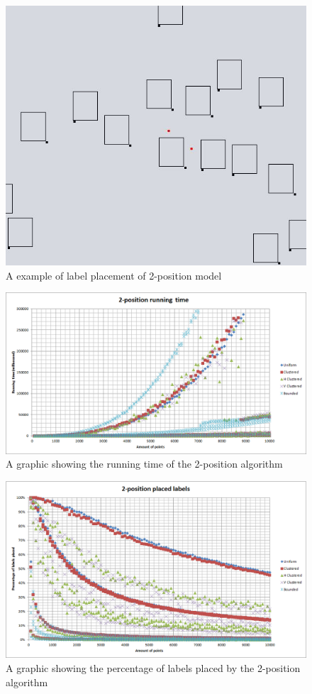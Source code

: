 \documentclass[crop=false,a4paper,oneside,11pt]{standalone}
\begin{document}
\begin{figure}[h!]
 \centering
  \centerline{\includegraphics[scale = 0.4]{2pos_example.JPG}}
  \caption{A example of label placement of 2-position model}
 \end{figure} 

\begin{figure}[h!]
 \centering
  \centerline{\includegraphics[scale = 0.6]{2PosRunningTime.png}}
  \caption{A graphic showing the running time of the 2-position algorithm}
 \end{figure}

\begin{figure}[h!]
 \centering
  \centerline{\includegraphics[scale = 0.6]{2PosLabelsPlaced.png}}
  \caption{A graphic showing the percentage of labels placed by the 2-position algorithm}
 \end{figure}
\end{document}

